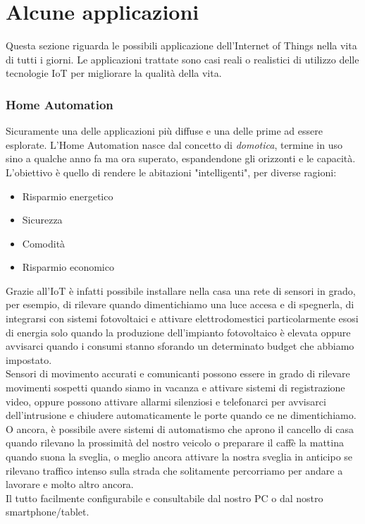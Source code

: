 \section{Alcune applicazioni}
Questa sezione riguarda le possibili applicazione dell'Internet of Things nella vita di tutti i giorni. Le applicazioni trattate sono casi reali o realistici di utilizzo delle tecnologie IoT per migliorare la qualità della vita.


\subsubsection{Home Automation}
Sicuramente una delle applicazioni più diffuse e una delle prime ad essere esplorate. L'Home Automation nasce dal concetto di \textit{domotica}, termine in uso sino a qualche anno fa ma ora superato, espandendone gli orizzonti e le capacità. L'obiettivo è quello di rendere le abitazioni "intelligenti", per diverse ragioni:
\begin{itemize}
\item Risparmio energetico
\item Sicurezza
\item Comodità
\item Risparmio economico
\end{itemize}
Grazie all'IoT è infatti possibile installare nella casa una rete di sensori in grado, per esempio, di rilevare quando dimentichiamo una luce accesa e di spegnerla, di integrarsi con sistemi fotovoltaici e attivare elettrodomestici particolarmente esosi di energia solo quando la produzione dell'impianto fotovoltaico è elevata oppure avvisarci quando i consumi stanno sforando un determinato budget che abbiamo impostato.
\\Sensori di movimento accurati e comunicanti possono essere in grado di rilevare movimenti sospetti quando siamo in vacanza e attivare sistemi di registrazione video, oppure possono attivare allarmi silenziosi e telefonarci per avvisarci dell'intrusione e chiudere automaticamente le porte quando ce ne dimentichiamo.
\\O ancora, è possibile avere sistemi di automatismo che aprono il cancello di casa quando rilevano la prossimità del nostro veicolo o preparare il caffè la mattina quando suona la sveglia, o meglio ancora attivare la nostra sveglia in anticipo se rilevano traffico intenso sulla strada che solitamente percorriamo per andare a lavorare e molto altro ancora.
\\Il tutto facilmente configurabile e consultabile dal nostro PC o dal nostro smartphone/tablet.
